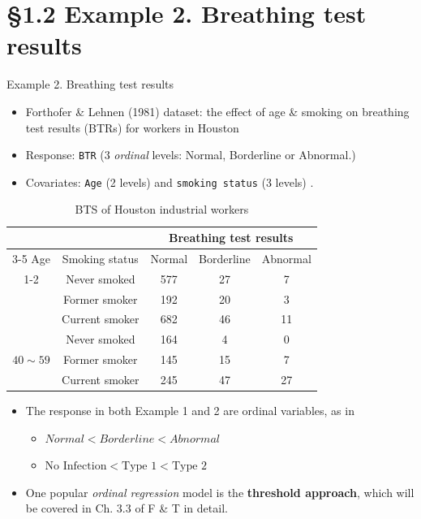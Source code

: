 \documentclass{beamer}
\newcommand{\currentsection}{}
\let\oldsection\section
\renewcommand{\section}[1]{\oldsection{#1}\renewcommand{\currentsection}{#1}}
\newenvironment{wideitemize}%
  {\begin{itemize}%
    \setlength{\parskip}{1em}}%
  {\end{itemize}}
\begin{document}
\section{\S1.2 Example 2. Breathing test results}\label{sec:Ex2}
\begin{frame}{Example 2. Breathing test results}
\begin{itemize}
\item
Forthofer \& Lehnen (1981) dataset: the effect of age \& smoking on breathing test results (BTRs)
for workers in Houston
\item
Response: \texttt{BTR} ($3$ \emph{ordinal} levels: Normal, Borderline or Abnormal.) 
\item
Covariates: \texttt{Age} (2 levels) and \texttt{smoking status} (3 levels) .
\end{itemize}
\begin{table} [!htbp]
\caption{BTS of Houston industrial workers \label{tab1.2}}
\begin{center}
\begin{tabular}{|cc|ccc|}
\hline
 \multicolumn{2}{|c}{} &\multicolumn{3}{c|}{Breathing test results}  \\ \cline{3-5} 
Age & Smoking status & Normal & Borderline & Abnormal \\ \cline{1-2}
\multirow{3}{*}{$< 40$} & Never smoked & 577 & 27 & 7 \\
& Former smoker & 192 & 20 & 3 \\
& Current smoker & 682 & 46 & 11 \\  \hline
\multirow{3}{*}{$40\sim 59$} & Never smoked & 164 & 4 & 0 \\
& Former smoker & 145 & 15 & 7 \\
& Current smoker & 245 & 47 & 27 \\  \hline
\end{tabular}
\end{center}
\end{table}
\end{frame}
\begin{frame}
\begin{wideitemize}

\item The response in both Example 1 and 2 are ordinal variables, as in \begin{itemize} \item $Normal < Borderline < Abnormal$ \item $\text{No Infection}< \text{Type 1} < \text{Type 2}$ \end{itemize}

\item One popular \emph{ordinal regression} model is the {\bf threshold approach}, which will be covered in Ch. 3.3 of F \& T in detail.


\end{wideitemize}

\end{frame}
\end{document}
